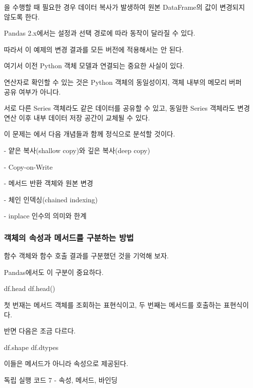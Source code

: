 을 수행할 때 필요한 경우 데이터 복사가 발생하여 원본 DataFrame의 값이 변경되지 않도록 한다.

Pandas 2.x에서는 설정과 선택 경로에 따라 동작이 달라질 수 있다.

따라서 이 예제의 변경 결과를 모든 버전에 적용해서는 안 된다.

여기서 이전 Python 객체 모델과 연결되는 중요한 사실이 있다.

 연산자로 확인할 수 있는 것은 Python 객체의 동일성이지, 객체 내부의 메모리 버퍼 공유 여부가 아니다.

서로 다른 Series 객체라도 같은 데이터를 공유할 수 있고, 동일한 Series 객체라도 변경 연산 이후 내부 데이터 저장 공간이 교체될 수 있다.

이 문제는 에서 다음 개념들과 함께 정식으로 분석할 것이다.

\begin{dhksmry}
    - 얕은 복사(shallow copy)와 깊은 복사(deep copy)

    - Copy-on-Write

    - 메서드 반환 객체와 원본 변경

    - 체인 인덱싱(chained indexing)

    - inplace 인수의 의미와 한계
\end{dhksmry}

\subsubsection{객체의 속성과 메서드를 구분하는 방법}

함수 객체와 함수 호출 결과를 구분했던 것을 기억해 보자.

Pandas에서도 이 구분이 중요하다.

\begin{dhkcode}
df.head
df.head()
\end{dhkcode}

첫 번재는 메서드 객체를 조회하는 표현식이고, 두 번째는 메서드를 호출하는 표현식이다.

반면 다음은 조금 다르다.

\begin{dhkcode}
df.shape
df.dtypes
\end{dhkcode}

이들은 메서드가 아니라 속성으로 제공된다.

\begin{dhknote}
\begin{dhksmry}[centered]
독립 실행 코드 7 - 속성, 메서드, 바인딩
\end{dhksmry}
\end{dhknote}

